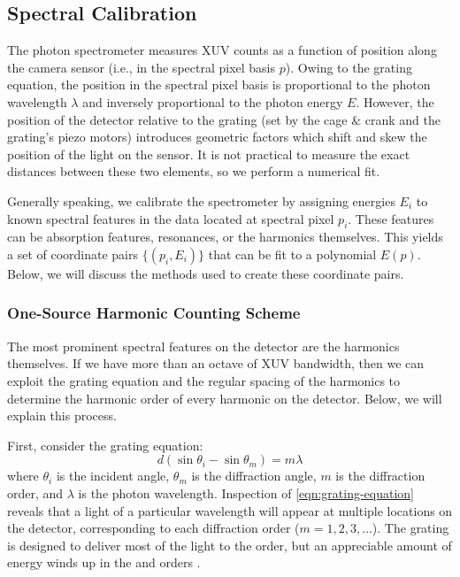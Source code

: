 
\subsection{Spectral Calibration}
\label{sec:XUV-spectral-calibration}

The photon spectrometer measures XUV counts as a function of position along the camera sensor (i.e., in the spectral pixel basis $p$). Owing to the grating equation, the position in the spectral pixel basis is proportional to the photon wavelength $\lambda$ and inversely proportional to the photon energy $E$. However, the position of the detector relative to the grating (set by the cage \& crank and the grating's piezo motors) introduces geometric factors which shift and skew the position of the light on the sensor. It is not practical to measure the exact distances between these two elements, so we perform a numerical fit.

Generally speaking, we calibrate the spectrometer by assigning energies $E_i$ to known spectral features in the data located at spectral pixel $p_i$. These features can be absorption features, resonances, or the harmonics themselves. This yields a set of coordinate pairs $\{(p_i,E_i)\}$ that can be fit to a polynomial $E(p)$. Below, we will discuss the methods used to create these coordinate pairs.

\subsubsection{One-Source Harmonic Counting Scheme}

The most prominent spectral features on the detector are the harmonics themselves. If we have more than an octave of XUV bandwidth, then we can exploit the grating equation and the regular spacing of the harmonics to determine the harmonic order of every harmonic on the detector. Below, we will explain this process.

First, consider the grating equation:
\begin{equation}
d (\sin \theta_i - \sin \theta_m) = m \lambda
\label{eqn:grating-equation}
\end{equation}
where $\theta_i$ is the incident angle, $\theta_m$ is the diffraction angle, $m$ is the diffraction order, and $\lambda$ is the photon wavelength. Inspection of \cref{eqn:grating-equation} reveals that a light of a particular wavelength will appear at multiple locations on the detector, corresponding to each diffraction order ($m=1, 2, 3, \dots$). The grating is designed to deliver most of the light to the  order, but an appreciable amount of energy winds up in the  and  orders \cite{obryanHighResolutionXUV2015,hagemanComplexAttosecondTransientAbsorption2020}.


